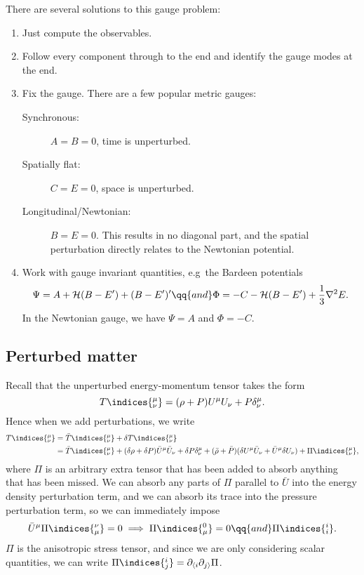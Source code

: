 \documentclass{jknotes}
\begin{document}
There are several solutions to this gauge problem:
\begin{enumerate}
    \item Just compute the observables.
    \item Follow every component through to the end and identify the gauge modes at the end.
    \item Fix the gauge. There are a few popular metric gauges:
        \begin{description}
            \item[Synchronous:] \(A=B=0\), time is unperturbed.
            \item[Spatially flat:] \(C=E=0\), space is unperturbed.
            \item[Longitudinal/Newtonian:] \(B=E=0\). This results in no diagonal part, and the spatial perturbation directly relates to the Newtonian potential.
        \end{description}
    \item Work with gauge invariant quantities, e.g\ the Bardeen potentials
        \begin{equation}
            \Psi = A + \mathcal{H}(B-E') + (B-E')' \qq{and} \Phi = -C - \mathcal{H}(B-E') + \frac13\nabla^2E.
        \end{equation}
        In the Newtonian gauge, we have \(\Psi=A\) and \(\Phi = -C\).
\end{enumerate}

\subsection{Perturbed matter}
Recall that the unperturbed energy-momentum tensor takes the form
\begin{equation}
    T\indices{^\mu_\nu} = (\rho+P)U^\mu U_\nu + P\delta^\mu_\nu.
\end{equation}
Hence when we add perturbations, we write
\begin{align}
    T\indices{^\mu_\nu} &= \bar{T}\indices{^\mu_\nu} + \delta T\indices{^\mu_\nu} \\
                        &= \bar{T}\indices{^\mu_\nu} + (\delta\rho+\delta P)\bar{U}^\mu\bar{U}_\nu + \delta P \delta^\mu_\nu + (\bar{\rho}+\bar{P})(\delta U^\mu\bar{U}_\nu + \bar{U}^\mu\delta U_\nu) + \Pi\indices{^\mu_\nu},
\end{align}
where \(\Pi\) is an arbitrary extra tensor that has been added to absorb anything that has been missed. We can absorb any parts of \(\Pi\) parallel to \(\bar{U}\) into the energy density perturbation term, and we can absorb its trace into the pressure perturbation term, so we can immediately impose
\begin{equation}
    \bar{U}^\mu\Pi\indices{^\nu_\mu} = 0 \implies \Pi\indices{^0_\mu}=0 \qq{and} \Pi\indices{^i_i}.
\end{equation}
\(\Pi\) is the anisotropic stress tensor, and since we are only considering scalar quantities, we can write \(\Pi\indices{^i_j}=\partial_{\langle i}\partial_{j\rangle}\Pi\).
\end{document}
